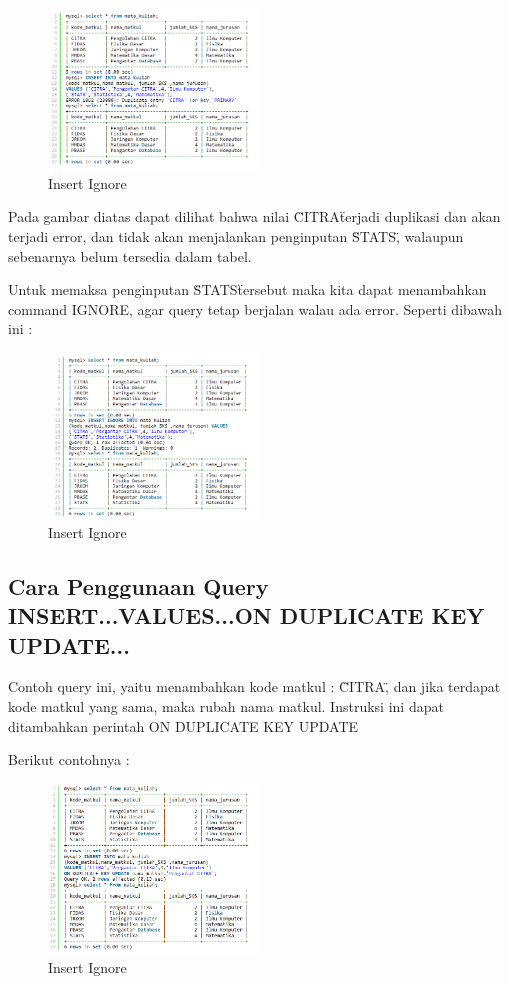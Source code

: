 		\begin{figure}[ht]
			\centerline{\includegraphics[width=0.5\textwidth]{figures/insert6.png}}
			\caption{Insert Ignore}
			\label{insert6}
			\end{figure}
			
	Pada gambar diatas dapat dilihat bahwa nilai \"CITRA\" terjadi duplikasi dan akan terjadi error, dan tidak akan menjalankan penginputan \"STATS\", walaupun sebenarnya belum tersedia dalam tabel.
	
	Untuk memaksa penginputan \"STATS\" tersebut  maka kita dapat menambahkan command IGNORE, agar query tetap berjalan walau ada error. Seperti dibawah ini :
	
		\begin{figure}[ht]
			\centerline{\includegraphics[width=0.5\textwidth]{figures/insert7.png}}
			\caption{Insert Ignore}
			\label{insert7}
			\end{figure}
			
	\subsection{Cara Penggunaan Query INSERT...VALUES...ON DUPLICATE KEY UPDATE...}
	Contoh query ini, yaitu menambahkan kode matkul : \"CITRA\" , dan jika terdapat kode matkul yang sama, maka rubah nama matkul. Instruksi ini dapat ditambahkan perintah ON DUPLICATE KEY UPDATE
	
	Berikut contohnya :
	
		\begin{figure}[ht]
			\centerline{\includegraphics[width=0.5\textwidth]{figures/insert8.png}}
			\caption{Insert Ignore}
			\label{insert8}
			\end{figure}
	
